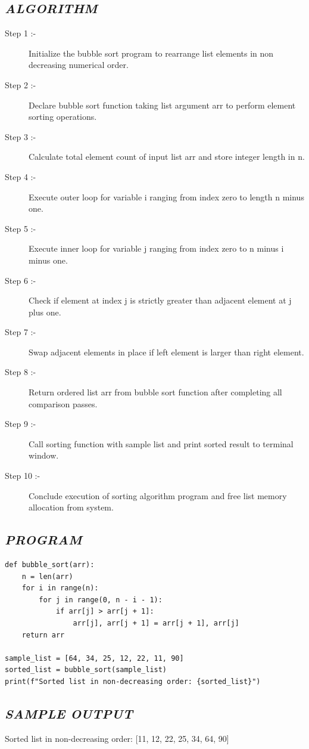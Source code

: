 \documentclass[11pt,a4paper]{article}
\begin{document}
\subsection*{\textit{ALGORITHM}}
\begin{description}
  \item[Step 1 :-] Initialize the bubble sort program to rearrange list elements in non decreasing numerical order.
  \item[Step 2 :-] Declare bubble sort function taking list argument arr to perform element sorting operations.
  \item[Step 3 :-] Calculate total element count of input list arr and store integer length in n.
  \item[Step 4 :-] Execute outer loop for variable i ranging from index zero to length n minus one.
  \item[Step 5 :-] Execute inner loop for variable j ranging from index zero to n minus i minus one.
  \item[Step 6 :-] Check if element at index j is strictly greater than adjacent element at j plus one.
  \item[Step 7 :-] Swap adjacent elements in place if left element is larger than right element.
  \item[Step 8 :-] Return ordered list arr from bubble sort function after completing all comparison passes.
  \item[Step 9 :-] Call sorting function with sample list and print sorted result to terminal window.
  \item[Step 10 :-] Conclude execution of sorting algorithm program and free list memory allocation from system.
\end{description}

\subsection*{\textit{PROGRAM}}
\begin{lstlisting}[style=pythonstyle]
def bubble_sort(arr): 
    n = len(arr) 
    for i in range(n): 
        for j in range(0, n - i - 1): 
            if arr[j] > arr[j + 1]: 
                arr[j], arr[j + 1] = arr[j + 1], arr[j] 
    return arr 
 
sample_list = [64, 34, 25, 12, 22, 11, 90] 
sorted_list = bubble_sort(sample_list) 
print(f"Sorted list in non-decreasing order: {sorted_list}")
\end{lstlisting}

\subsection*{\textit{SAMPLE OUTPUT}}
\begin{tcolorbox}[colback=black!85,colframe=navyblue,title=\textbf{Terminal Output},coltitle=white,fonttitle=\bfseries\small]
\small\ttfamily\color{green!30!white}
Sorted list in non-decreasing order: [11, 12, 22, 25, 34, 64, 90]
\end{tcolorbox}
\end{document}
